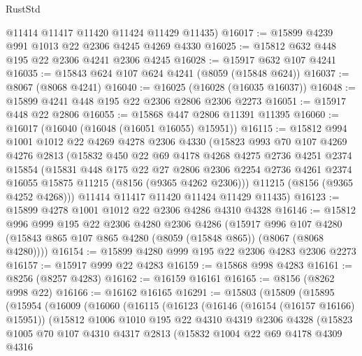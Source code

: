 \begin{lexlean}{RustStd}
\begin{coremodule}
      @11414
      @11417
      @11420
      @11424
      @11429
      @11435)
@16017 := @15899 @4239 @991 @1013 @22 @2306 @4245 @4269 @4330
@16025 := @15812 @632 @448 @195 @22 @2306 @4241 @2306 @4245
@16028 := @15917 @632 @107 @4241
@16035 := @15843 @624 @107 @624 @4241 (@8059 (@15848 @624))
@16037 := @8067 (@8068 @4241)
@16040 := @16025 (@16028 (@16035 @16037))
@16048 := @15899 @4241 @448 @195 @22 @2306 @2806 @2306 @2273
@16051 := @15917 @448 @22 @2806
@16055 := @15868 @447 @2806 @11391 @11395
@16060 := @16017 (@16040 (@16048 (@16051 @16055) @15951))
@16115 := @15812
    @994
    @1001
    @1012
    @22
    @4269
    @4278
    @2306
    @4330
    (@15823
      @993
      @70
      @107
      @4269
      @4276
      @2813
      (@15832
        @450
        @22
        @69
        @4178
        @4268
        @4275
        @2736
        @4251
        @2374
        @15854
        (@15831
          @448
          @175
          @22
          @27
          @2806
          @2306
          @2254
          @2736
          @4261
          @2374
          @16055
          @15875
          @11215
          (@8156 (@9365 @4262 @2306)))
        @11215
        (@8156 (@9365 @4252 @4268)))
      @11414
      @11417
      @11420
      @11424
      @11429
      @11435)
@16123 := @15899 @4278 @1001 @1012 @22 @2306 @4286 @4310 @4328
@16146 := @15812
    @996
    @999
    @195
    @22
    @2306
    @4280
    @2306
    @4286
    (@15917
      @996
      @107
      @4280
      (@15843 @865 @107 @865 @4280 (@8059 (@15848 @865)) (@8067 (@8068 @4280))))
@16154 := @15899 @4280 @999 @195 @22 @2306 @4283 @2306 @2273
@16157 := @15917 @999 @22 @4283
@16159 := @15868 @998 @4283
@16161 := @8256 (@8257 @4283)
@16162 := @16159 @16161
@16165 := @8156 (@8262 @998 @22)
@16166 := @16162 @16165
@16291 := @15803
    (@15809
      (@15895
        (@15954
          (@16009
            (@16060
              (@16115
                (@16123
                  (@16146 (@16154 (@16157 @16166) @15951))
                  (@15812
                    @1006
                    @1010
                    @195
                    @22
                    @4310
                    @4319
                    @2306
                    @4328
                    (@15823
                      @1005
                      @70
                      @107
                      @4310
                      @4317
                      @2813
                      (@15832
                        @1004
                        @22
                        @69
                        @4178
                        @4309
                        @4316

\end{coremodule}
\end{lexlean}
